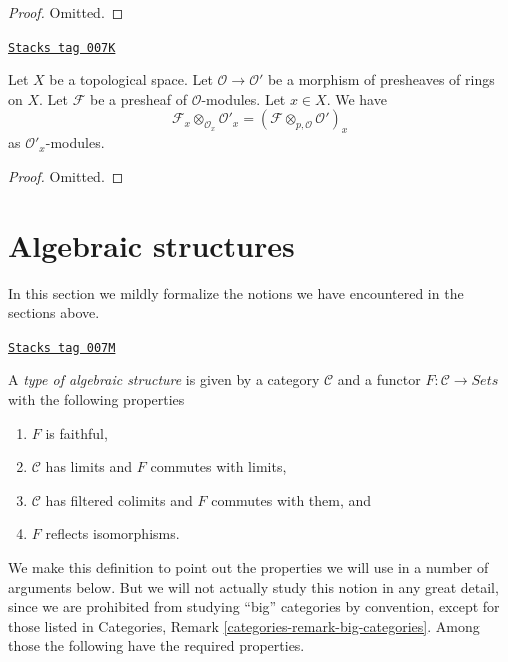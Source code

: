\begin{proof}
Omitted.
\end{proof}

\begin{lemma}
\label{sheaves-lemma-stalk-tensor-presheaf-modules}
\href{https://stacks.math.columbia.edu/tag/007K}{\texttt{Stacks tag 007K}}

Let $X$ be a topological space.
Let $\mathcal{O} \to \mathcal{O}'$ be a morphism of
presheaves of rings on $X$.
Let $\mathcal{F}$ be a presheaf of $\mathcal{O}$-modules.
Let $x \in X$. We have
$$
\mathcal{F}_x \otimes_{\mathcal{O}_x} \mathcal{O}'_x
=
(\mathcal{F} \otimes_{p, \mathcal{O}} \mathcal{O}')_x
$$
as $\mathcal{O}'_x$-modules.
\end{lemma}

\begin{proof}
Omitted.
\end{proof}

\section{Algebraic structures}
\label{sheaves-section-algebraic-structures}
In this section we mildly formalize the notions we have
encountered in the sections above.

\begin{definition}
\label{sheaves-definition-algebraic-structure}
\href{https://stacks.math.columbia.edu/tag/007M}{\texttt{Stacks tag 007M}}

A {\it type of algebraic structure} is given by a category $\mathcal{C}$
and a functor $F : \mathcal{C} \to \textit{Sets}$ with the
following properties
\begin{enumerate}
\item $F$ is faithful,
\item $\mathcal{C}$ has limits and $F$ commutes with limits,
\item $\mathcal{C}$ has filtered colimits and $F$ commutes with them, and
\item $F$ reflects isomorphisms.
\end{enumerate}
\end{definition}

We make this definition to point out the properties
we will use in a number of arguments below.  But we will
not actually study this notion in any great detail, since we
are prohibited from studying ``big'' categories by convention,
except for those listed in
Categories, Remark \ref{categories-remark-big-categories}.
Among those the following have the required properties.

